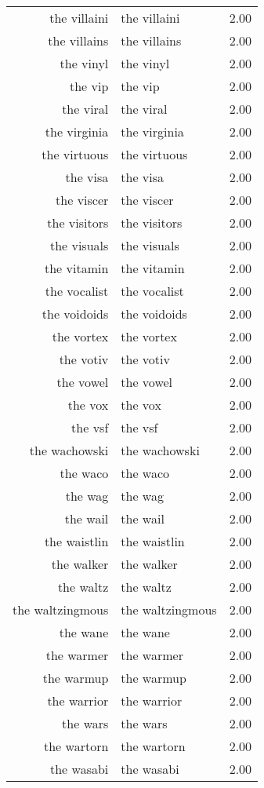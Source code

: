 \begin{table}[ht]
\begin{tabular}{rlr}
  the villaini & the villaini & 2.00 \\ 
  the villains & the villains & 2.00 \\ 
  the vinyl & the vinyl & 2.00 \\ 
  the vip & the vip & 2.00 \\ 
  the viral & the viral & 2.00 \\ 
  the virginia & the virginia & 2.00 \\ 
  the virtuous & the virtuous & 2.00 \\ 
  the visa & the visa & 2.00 \\ 
  the viscer & the viscer & 2.00 \\ 
  the visitors & the visitors & 2.00 \\ 
  the visuals & the visuals & 2.00 \\ 
  the vitamin & the vitamin & 2.00 \\ 
  the vocalist & the vocalist & 2.00 \\ 
  the voidoids & the voidoids & 2.00 \\ 
  the vortex & the vortex & 2.00 \\ 
  the votiv & the votiv & 2.00 \\ 
  the vowel & the vowel & 2.00 \\ 
  the vox & the vox & 2.00 \\ 
  the vsf & the vsf & 2.00 \\ 
  the wachowski & the wachowski & 2.00 \\ 
  the waco & the waco & 2.00 \\ 
  the wag & the wag & 2.00 \\ 
  the wail & the wail & 2.00 \\ 
  the waistlin & the waistlin & 2.00 \\ 
  the walker & the walker & 2.00 \\ 
  the waltz & the waltz & 2.00 \\ 
  the waltzingmous & the waltzingmous & 2.00 \\ 
  the wane & the wane & 2.00 \\ 
  the warmer & the warmer & 2.00 \\ 
  the warmup & the warmup & 2.00 \\ 
  the warrior & the warrior & 2.00 \\ 
  the wars & the wars & 2.00 \\ 
  the wartorn & the wartorn & 2.00 \\ 
  the wasabi & the wasabi & 2.00 \\ 

\end{tabular}
\end{table}
